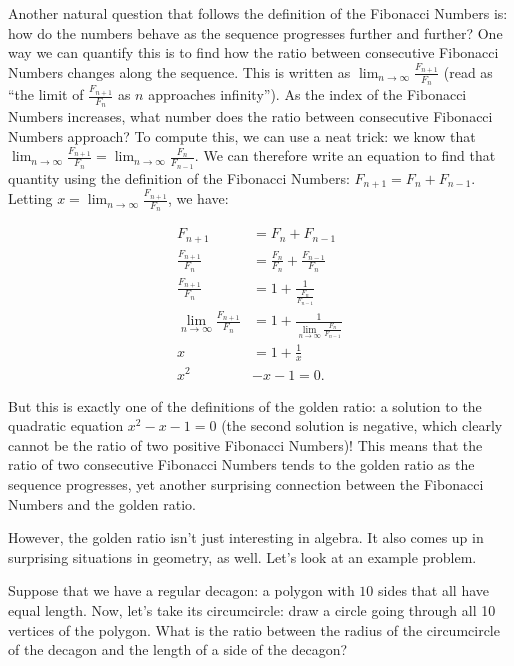 \documentclass{article}
\begin{document}
Another natural question that follows the definition of the Fibonacci Numbers is: how do the numbers behave as the sequence progresses further and further? One way we can quantify this is to find how the ratio between consecutive Fibonacci Numbers changes along the sequence. This is written as $\lim_{n\to\infty}\frac{F_{n+1}}{F_n}$ (read as ``the limit of $\frac{F_{n+1}}{F_n}$ as $n$ approaches infinity''). As the index of the Fibonacci Numbers increases, what number does the ratio between consecutive Fibonacci Numbers approach?
To compute this, we can use a neat trick: we know that $\lim_{n\to\infty}\frac{F_{n+1}}{F_n}=\lim_{n\to\infty}\frac{F_n}{F_{n-1}}$. We can therefore write an equation to find that quantity using the definition of the Fibonacci Numbers: $F_{n+1}=F_n+F_{n-1}$. Letting $x=\lim_{n\to\infty}\frac{F_{n+1}}{F_n}$, we have:

\begin{align*}
    F_{n+1}&=F_n+F_{n-1}\\
    \frac{F_{n+1}}{F_n}&=\frac{F_n}{F_n}+\frac{F_{n-1}}{F_n}\\
    \frac{F_{n+1}}{F_n}&=1+\frac{1}{\frac{F_n}{F_{n-1}}}\\
    \lim_{n\rightarrow\infty} \frac{F_{n+1}}{F_n}&=1+\frac{1}{\lim_{n\rightarrow\infty} \frac{F_{n}}{F_{n-1}}}\\
    x&=1+\frac{1}{x}\\
    x^2&-x-1=0.
\end{align*}


But this is exactly one of the definitions of the golden ratio: a solution to the quadratic equation $x^2-x-1=0$ (the second solution is negative, which clearly cannot be the ratio of two positive Fibonacci Numbers)! This means that the ratio of two consecutive Fibonacci Numbers tends to the golden ratio as the sequence progresses, yet another surprising connection between the Fibonacci Numbers and the golden ratio.

However, the golden ratio isn’t just interesting in algebra. It also comes up in surprising situations in geometry, as well. Let’s look at an example problem.

Suppose that we have a regular decagon: a polygon with $10$ sides that all have equal length. Now, let’s take its circumcircle: draw a circle going through all 10 vertices of the polygon. What is the ratio between the radius of the circumcircle of the decagon and the length of a side of the decagon?
\end{document}
